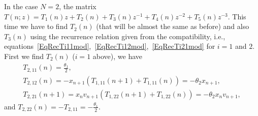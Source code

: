 \documentclass[pdftex]{sigma}%
\numberwithin{equation}{section}
\begin{document}
	\begin{Example}
In the case $N=2$, the matrix $T(n;z)=T_1(n)z+T_2(n)+T_3(n)z^{-1}+T_4(n)z^{-2}+T_5(n)z^{-3}$. This time we have to find $T_2(n)$ (that will be almost the same as before) and also~$T_3(n)$ using the recurrence relation given from the compatibility, i.e., equations~\eqref{EqRecTi11mod},~\eqref{EqRecTi12mod},~\eqref{EqRecTi21mod} for $i=1$ and $2$. First we find $T_2(n)$ ($i=1$ above), we have
\begin{gather*}
T_{2,11}(n)=\frac{\theta_1}{2},
\\
T_{2,12}(n)=-x_{n+1}(T_{1,11}(n+1)+T_{1,11}(n))=-\theta_2x_{n+1},
\\
T_{2,21}(n+1)=x_nv_{n+1}(T_{1,22}(n+1)+T_{1,22}(n))=-\theta_2 x_nv_{n+1},
\end{gather*}
and $T_{2,22}(n)=-T_{2,11}=-\frac{\theta_1}{2}$.


\end{Example}
\end{document}
